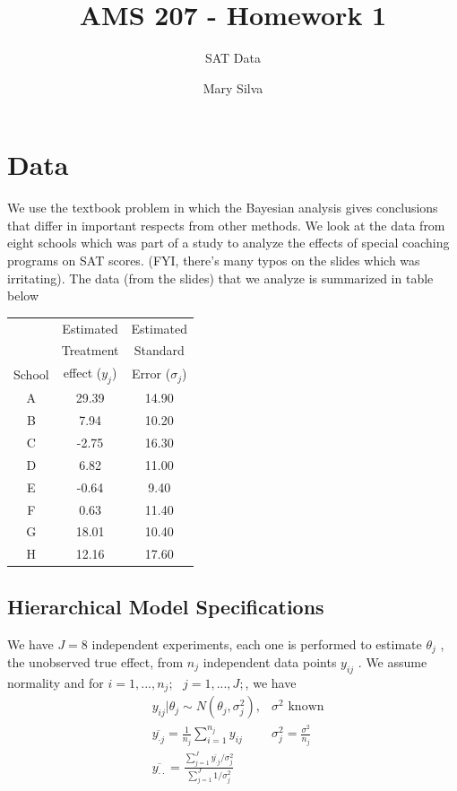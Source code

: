 \documentclass[a4paper, 9pt]{article}
\title{AMS 207 - Homework 1}
\date{Mary Silva}
\author{SAT Data}
\newcommand{\suminj}{\sum_{i=1}^{n_j}}
\begin{document}
\maketitle


\section{Data}
We use the textbook problem in which the Bayesian analysis gives conclusions that differ in important respects from other methods. We look at the data from eight schools which was part of a study to analyze the effects of special coaching programs on SAT scores. (FYI, there's many typos on the slides which was irritating).
The data (from the slides) that we analyze is summarized in table below

\begin{table}[h!]
\centering
\begin{tabular}{ccc}
  \hline
  &Estimated &Estimated \\
  &Treatment&Standard\\
 School &  effect ($y_j$) &  Error ($\sigma_j$) \\ 
  \hline
    A & 29.39 & 14.90 \\ 
    B & 7.94 & 10.20 \\ 
    C & -2.75 & 16.30 \\ 
    D & 6.82 & 11.00 \\ 
    E & -0.64 & 9.40 \\ 
    F & 0.63 & 11.40 \\ 
    G & 18.01 & 10.40 \\ 
    H & 12.16 & 17.60 \\ 
   \hline
\end{tabular}
\end{table}
\subsection{Hierarchical Model Specifications}
We have $J = 8$ independent experiments, each one is performed to estimate $\theta_j$ , the unobserved true effect, from $n_j$ independent data points $y_{ij}$ .  We assume normality and for $i = 1,...,n_j;\text{ } j = 1,..., J;$, we have
\begin{align*}
    &y_{ij}| \theta_j \sim N(\theta_j, \sigma^2_j),  &\sigma^2 \text{ known}\\
    &\overline{y_{\cdot j}} = \frac{1}{n_j}  \suminj y_{ij} &\sigma_j^2  = \frac{\sigma^2}{n_j}\\
    &\overline{y_{\cdot\cdot}} = \frac{\sum_{j=1}^J \overline{y_{\cdot j}}/\sigma_j^2}{\sum_{j=1}^J 1/\sigma_j^2}
\end{align*}
\end{document}
